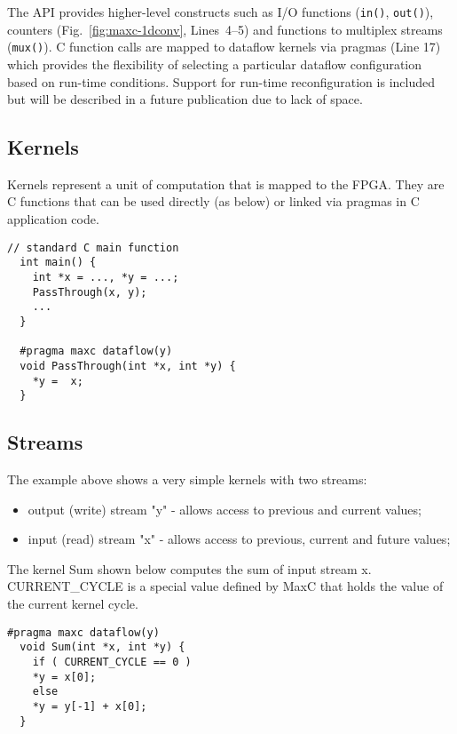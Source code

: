 The \FAST{} API provides higher-level constructs such as I/O functions
(\texttt{in()}, \texttt{out()}), counters (Fig.~\ref{fig:maxc-1dconv},
Lines~4--5) and functions to multiplex streams (\texttt{mux()}). C
function calls are mapped to dataflow kernels via pragmas (Line 17)
which provides the flexibility of selecting a particular dataflow
configuration based on run-time conditions. Support for run-time
reconfiguration is included but will be described in a future
publication due to lack of space.

\subsection{Kernels}

Kernels represent a unit of computation that is mapped to the FPGA.
They are C functions that can be used directly (as below) or linked
via pragmas in C application code.

\begin{lstlisting}[caption={Simple \FAST{} dataflow kernel.}]
  // standard C main function
  int main() {
    int *x = ..., *y = ...;
    PassThrough(x, y);
    ...
  }

  #pragma maxc dataflow(y)
  void PassThrough(int *x, int *y) {
    *y =  x;
  }
\end{lstlisting}

\subsection{Streams}
The example above shows a very simple kernels with two streams:

\begin{itemize}
\item output (write) stream "y" - allows access to previous and current values;
\item input (read) stream "x" - allows access to previous, current and future values;
\end{itemize}

The kernel Sum shown below computes the sum of input stream
x. CURRENT\_CYCLE is a special value defined by MaxC that holds the
value of the current kernel cycle.

\begin{lstlisting}[caption={\FAST{} kernel computing the sum of an input stream.}]
  #pragma maxc dataflow(y)
  void Sum(int *x, int *y) {
    if ( CURRENT_CYCLE == 0 )
    *y = x[0];
    else
    *y = y[-1] + x[0];
  }
\end{lstlisting}

